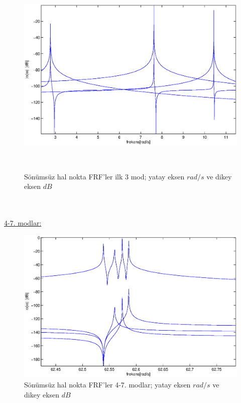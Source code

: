 \documentclass[a4paper]{report}
\begin{document}
\begin{figure}[H]
\shorthandoff{=}
\centerline{
{\includegraphics[width=1.3\textwidth]{./transferFRF1-3.eps}}}
~\\

\caption[Sönümsüz hal nokta FRF'ler]{Sönümsüz hal nokta FRF'ler ilk 3 mod; yatay eksen ${rad}/{s}$ ve dikey eksen $dB$ }
\label{fig:noktaFRF1-3}
\end{figure}
~\\
\clearpage~\\
\underline{4-7. modlar:}\\
\begin{figure}[H]
\shorthandoff{=}
\centerline{
{\includegraphics[width=1.3\textwidth]{./transferFRF3-6.eps}}}
\caption[Sönümsüz hal nokta FRF'ler]{Sönümsüz hal nokta FRF'ler  4-7. modlar; yatay eksen ${rad}/{s}$ ve dikey eksen $dB$ }
\label{fig:noktaFRF4-7}
\end{figure}
\end{document}
